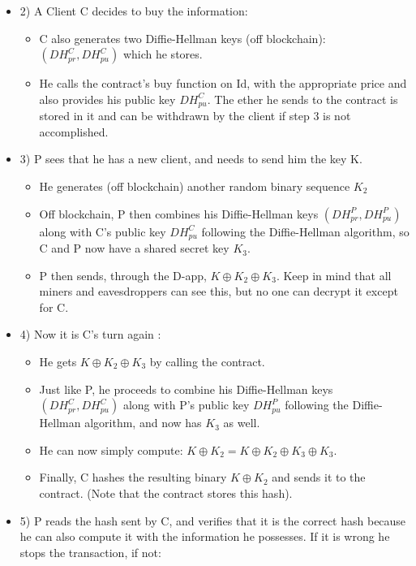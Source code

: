 \documentclass[conference]{IEEEtran}
\begin{document}
\begin{itemize}
\begin{itemize}
        \end{itemize}
    \item 2) A Client C decides to buy the information:
        \begin{itemize}
            \item C also generates two Diffie-Hellman keys (off blockchain): $(DH^{C}_{pr}, DH^{C}_{pu})$ which he stores.
            \item He calls the contract's buy function on Id, with the appropriate price and also provides his public key $DH^{C}_{pu}$. The ether he sends to the contract is stored in it and can be withdrawn by the client if step 3 is not accomplished.
        \end{itemize}
    \item 3) P sees that he has a new client, and needs to send him the key K.
    \begin{itemize}
        \item He generates (off blockchain) another random binary sequence $K_2$
        \item Off blockchain, P then combines his Diffie-Hellman keys $(DH^{P}_{pr}, DH^{P}_{pu})$ along with C's public key $DH^{C}_{pu}$ following the Diffie-Hellman algorithm, so C and P now have a shared secret key $K_3$.
        \item P then sends, through the D-app, $K \oplus K_2 \oplus K_3 $. Keep in mind that all miners and eavesdroppers can see this, but no one can decrypt it except for C.
    \end{itemize}
    \item 4) Now it is C's turn again :
    \begin{itemize}
        \item He gets $K \oplus K_2 \oplus K_3 $ by calling the contract.
        \item Just like P, he proceeds to combine his Diffie-Hellman keys $(DH^{C}_{pr}, DH^{C}_{pu})$ along with P's public key $DH^{P}_{pu}$ following the Diffie-Hellman algorithm, and now has $K_3$ as well.
        \item He can now simply compute: $K \oplus K_2 =  K \oplus K_2 \oplus K_3 \oplus K_3 $.
        \item Finally, C hashes the resulting binary $K \oplus K_2$ and sends it to the contract. (Note that the contract stores this hash).
    \end{itemize}
    \item 5) P reads the hash sent by C, and verifies that it is the correct hash because he can also compute it with the information he possesses. If it is wrong he stops the transaction, if not:

\end{itemize}
\end{document}
